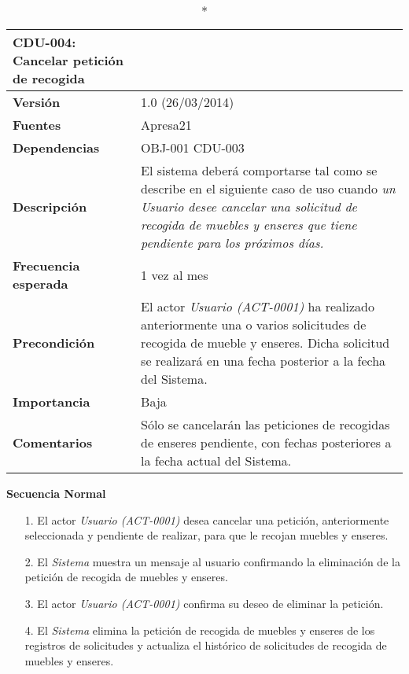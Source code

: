 \begin{longtable}{p{2.5cm}  p{14cm}}
\caption*{\textbf{CDU-004: Cancelar petición de recogida}} \\
\hline
\textbf{Versión} & 1.0 (26/03/2014) \\
\textbf{Fuentes} & Apresa21 \\
\textbf{Dependencias} & OBJ-001 CDU-003 \\
\textbf{Descripción} & El sistema deberá comportarse tal como se describe en el siguiente caso de uso cuando \textit{un Usuario desee cancelar una solicitud de recogida de muebles y enseres que tiene pendiente para los próximos días.} \\
\textbf{Frecuencia esperada} & 1 vez al mes  \\
\textbf{Precondición} & El actor \textit{Usuario (ACT-0001)} ha realizado anteriormente una o varios solicitudes de recogida de mueble y enseres. Dicha solicitud se realizará en una fecha posterior a la fecha del Sistema. \\
\textbf{Importancia} & Baja  \\
\textbf{Comentarios} & Sólo se cancelarán las peticiones de recogidas de enseres pendiente, con fechas posteriores a la fecha actual del Sistema. \\
\end{longtable}

\textbf{Secuencia Normal} 
\begin{enumerate}
	\item[1.] El actor \textit{Usuario (ACT-0001)} desea cancelar una petición, anteriormente seleccionada y pendiente de realizar, para que le recojan muebles y enseres.
	\item[2.] El \textit{Sistema} muestra un mensaje al usuario confirmando la eliminación de la petición de recogida de muebles y enseres.
	\item[3.] El actor \textit{Usuario (ACT-0001)} confirma su deseo de eliminar la petición.
	\item[4.] El \textit{Sistema} elimina la petición de recogida de muebles y enseres de los registros de solicitudes y actualiza el histórico de solicitudes de recogida de muebles y enseres.
\end{enumerate}